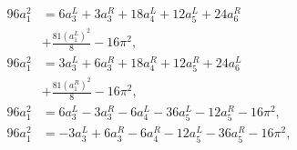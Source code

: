 \begin{equation}\begin{split}
96a_1^2&= 6a_3^L+3a_3^R+18a_4^L+12a_5^L+24a_6^R\\&+\frac{81(a_1^L)^2}{8}-16\pi^2,\\
96a_1^2&= 3a_3^L+6a_3^R+18a_4^R+12a_5^R+24a_6^L\\&+\frac{81(a_1^R)^2}{8}-16\pi^2,\\
96a_1^2&= 6a_3^L-3a_3^R-6a_4^L-36a_5^L-12a_5^R-16\pi^2,\\
96a_1^2&=-3a_3^L+6a_3^R-6a_4^R-12a_5^L-36a_5^R-16\pi^2,
\end{split}\end{equation}


